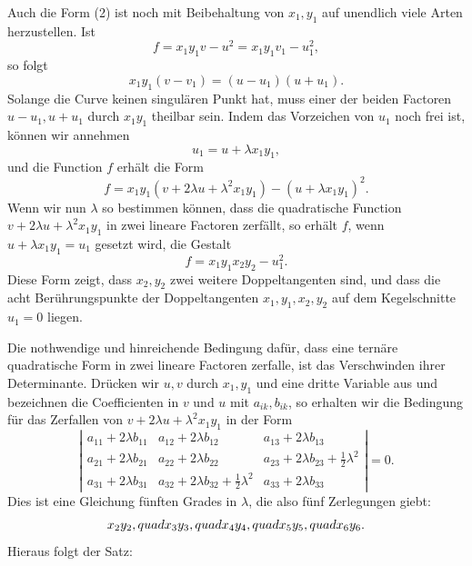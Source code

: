 \documentclass[11pt]{article}
\begin{document}
Auch die Form (2) ist noch mit Beibehaltung von \(x_1,y_1\) auf unendlich viele Arten herzustellen. Ist
\[
 f=x_1y_1v-u^2=x_1y_1v_1-u_1^2,
\]
so folgt
\begin{equation}
 x_1y_1(v-v_1)=(u-u_1)(u+u_1).
 \tag{3}
\end{equation}
Solange die Curve keinen singulären Punkt hat, muss einer der beiden Factoren \(u-u_1,u+u_1\) durch \(x_1y_1\) theilbar sein. Indem das Vorzeichen von \(u_1\) noch frei ist, können wir annehmen
\[
 u_1=u+\lambda x_1y_1,
\]
und die Function \(f\) erhält die Form
\begin{equation}
 f=x_1y_1(v+2\lambda u+\lambda^2x_1y_1)-(u+\lambda x_1y_1)^2.
 \tag{4}
\end{equation}
Wenn wir nun \(\lambda\) so bestimmen können, dass die quadratische Function \(v+2\lambda u+\lambda^2x_1y_1\) in zwei lineare Factoren zerfällt, so erhält \(f\), wenn \(u+\lambda x_1y_1=u_1\) gesetzt wird, die Gestalt
\begin{equation}
 f=x_1y_1x_2y_2-u_1^2.
 \tag{5}
\end{equation}
Diese Form zeigt, dass \(x_2,y_2\) zwei weitere Doppeltangenten sind, und dass die acht Berührungspunkte der Doppeltangenten \(x_1,y_1,x_2,y_2\) auf dem Kegelschnitte \(u_1=0\) liegen.

Die nothwendige und hinreichende Bedingung dafür, dass eine ternäre quadratische Form in zwei lineare Factoren zerfalle, ist das Verschwinden ihrer Determinante. Drücken wir \(u,v\) durch \(x_1,y_1\) und eine dritte Variable aus und bezeichnen die Coefficienten in \(v\) und \(u\) mit \(a_{ik},b_{ik}\), so erhalten wir die Bedingung für das Zerfallen von \(v+2\lambda u+\lambda^2x_1y_1\) in der Form
\begin{equation}
 \left|\begin{array}{ccc}
 a_{11}+2\lambda b_{11}&a_{12}+2\lambda b_{12}&a_{13}+2\lambda b_{13}\\
 a_{21}+2\lambda b_{21}&a_{22}+2\lambda b_{22}&a_{23}+2\lambda b_{23}+\tfrac12\lambda^2\\
 a_{31}+2\lambda b_{31}&a_{32}+2\lambda b_{32}+\tfrac12\lambda^2&a_{33}+2\lambda b_{33}
 \end{array}\right|=0.
 \tag{6}
\end{equation}
Dies ist eine Gleichung fünften Grades in \(\lambda\), die also fünf Zerlegungen giebt:
\[
 x_2y_2,\\quad x_3y_3,\\quad x_4y_4,\\quad x_5y_5,\\quad x_6y_6.
\]
Hieraus folgt der Satz:
\end{document}
